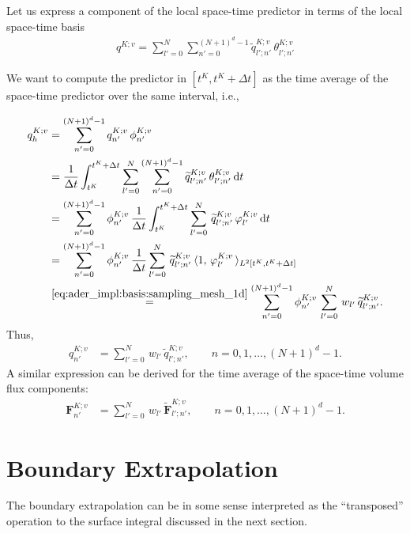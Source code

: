 \documentclass{scrreprt}
\theoremstyle{definition}
\theoremstyle{nonumberplain}
\newcommand{\cell}{K}
\newcommand{\dt}{\textup{d}t}
\begin{document}
Let us express a component of the local space-time predictor in terms
of the local space-time basis
\begin{align*}
q^{\cell;v}
=
\sum_{l'=0}^{N}
\sum_{n'=0}^{(N+1)^{d}-1}
\widetilde{q}^{\cell;v}_{l';n'}\,
\theta^{\cell;v}_{l';n'}
\end{align*}

We want to compute the predictor in $[t^\cell,t^\cell+\Delta t]$
as the time average of the space-time predictor over the same interval, i.e.,

\begin{align*}
q^{\cell;v}_h
&=
\sum_{n'=0}^{(N+1)^{d}-1}
q^{\cell;v}_{n'}\,
\phi^{\cell;v}_{n'}\,
\\
&=
\frac{1}{\Delta t}
\int_{t^\cell}^{t^\cell+\Delta t}
\sum_{l'=0}^{N}
\sum_{n'=0}^{(N+1)^{d}-1}
\widetilde{q}^{\cell;v}_{l';n'}\,
\theta^{\cell;v}_{l';n'}\,
\dt
\\
&=
\sum_{n'=0}^{(N+1)^{d}-1}
\phi^{\cell;v}_{n'}\,
\frac{1}{\Delta t}
\int_{t^\cell}^{t^\cell+\Delta t}
\sum_{l'=0}^{N}\,
\widetilde{q}^{\cell;v}_{l';n'}\,
\varphi^{\cell;v}_{l'}\,
\dt
\\
&=
\sum_{n'=0}^{(N+1)^{d}-1}
\phi^{\cell;v}_{n'}\,
\frac{1}{\Delta t}
\sum_{l'=0}^{N}\,
\widetilde{q}^{\cell;v}_{l';n'}\,
\langle
1,\,
\varphi^{\cell;v}_{l'}\,
\rangle_{L^2[t^\cell,t^\cell+\Delta t]}
\\
&\overset{\eqref{eq:ader_impl:basis:sampling_mesh_1d}}
{=}
\sum_{n'=0}^{(N+1)^{d}-1}
\phi^{\cell;v}_{n'}\,
\sum_{l'=0}^{N}\,
w_{l'}\,
\widetilde{q}^{\cell;v}_{l';n'}.
\end{align*}
Thus,
\begin{align}
q^{\cell;v}_{n'}
&=\sum_{l'=0}^{N}\,
w_{l'}\,
\widetilde{q}^{\cell;v}_{l';n'},\qquad n=0,1,\ldots,(N+1)^d-1.
\end{align}
A similar expression can be derived for the time average of
the space-time volume flux components:
\begin{align}
\textbf{F}^{\cell;v}_{n'}
&=\sum_{l'=0}^{N}\,
w_{l'}\,
\widetilde{\textbf{F}}^{\cell;v}_{l';n'},\qquad n=0,1,\ldots,(N+1)^d-1.
\end{align}
\section{Boundary Extrapolation}
The boundary extrapolation can be in some sense
interpreted as the ``transposed'' operation to
the surface integral discussed in the next section.
\end{document}
